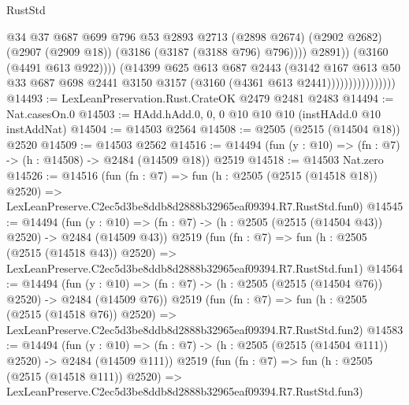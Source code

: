 \begin{lexlean}{RustStd}
\begin{coremodule}
                                        @34
                                        @37
                                        @687
                                        @699
                                        @796
                                        @53
                                        @2893
                                        @2713
                                        (@2898 @2674)
                                        (@2902 @2682)
                                        (@2907 (@2909 @18))
                                        (@3186 (@3187 (@3188 @796) @796))))
                                    @2891))
                                (@3160 (@4491 @613 @922))))
                            (@14399
                              @625
                              @613
                              @687
                              @2443
                              (@3142
                                @167
                                @613
                                @50
                                @33
                                @687
                                @698
                                @2441
                                @3150
                                @3157
                                (@3160 (@4361 @613 @2441))))))))))))))))
@14493 := LexLeanPreservation.Rust.CrateOK @2479 @2481 @2483
@14494 := Nat.casesOn.{0}
@14503 := HAdd.hAdd.{0, 0, 0} @10 @10 @10 (instHAdd.{0} @10 instAddNat)
@14504 := @14503 @2564
@14508 := @2505 (@2515 (@14504 @18)) @2520
@14509 := @14503 @2562
@14516 := @14494 (fun (y : @10) => (fn : @7) -> (h : @14508) -> @2484 (@14509 @18)) @2519
@14518 := @14503 Nat.zero
@14526 := @14516
    (fun (fn : @7) =>
    fun (h : @2505 (@2515 (@14518 @18)) @2520) =>
    LexLeanPreserve.C2ec5d3be8ddb8d2888b32965eaf09394.R7.RustStd.fun0)
@14545 := @14494
    (fun (y : @10) => (fn : @7) -> (h : @2505 (@2515 (@14504 @43)) @2520) -> @2484 (@14509 @43))
    @2519
    (fun (fn : @7) =>
    fun (h : @2505 (@2515 (@14518 @43)) @2520) =>
    LexLeanPreserve.C2ec5d3be8ddb8d2888b32965eaf09394.R7.RustStd.fun1)
@14564 := @14494
    (fun (y : @10) => (fn : @7) -> (h : @2505 (@2515 (@14504 @76)) @2520) -> @2484 (@14509 @76))
    @2519
    (fun (fn : @7) =>
    fun (h : @2505 (@2515 (@14518 @76)) @2520) =>
    LexLeanPreserve.C2ec5d3be8ddb8d2888b32965eaf09394.R7.RustStd.fun2)
@14583 := @14494
    (fun (y : @10) => (fn : @7) -> (h : @2505 (@2515 (@14504 @111)) @2520) -> @2484 (@14509 @111))
    @2519
    (fun (fn : @7) =>
    fun (h : @2505 (@2515 (@14518 @111)) @2520) =>
    LexLeanPreserve.C2ec5d3be8ddb8d2888b32965eaf09394.R7.RustStd.fun3)

\end{coremodule}
\end{lexlean}
